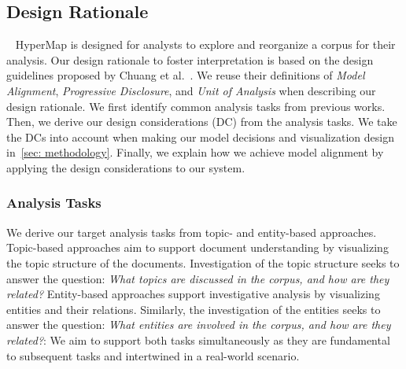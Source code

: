 \subsection{Design Rationale}~\label{sec: design_rationale}
HyperMap is designed for analysts to explore and reorganize a corpus for their analysis.
Our design rationale to foster interpretation is based on the design guidelines proposed by Chuang et al.~\cite{chuang2012interpretation}.
We reuse their definitions of \textit{Model Alignment}, \textit{Progressive Disclosure}, and \textit{Unit of Analysis} when describing our design rationale.
We first identify common analysis tasks from previous works.
Then, we derive our design considerations (DC) from the analysis tasks.
We take the DCs into account when making our model decisions and visualization design in~\autoref{sec: methodology}.
Finally, we explain how we achieve model alignment by applying the design considerations to our system.

\subsubsection{Analysis Tasks}
We derive our target analysis tasks from topic- and entity-based approaches.
Topic-based approaches aim to support document understanding by visualizing the topic structure of the documents.
Investigation of the topic structure seeks to answer the question: \textit{What topics are discussed in the corpus, and how are they related?}
Entity-based approaches support investigative analysis by visualizing entities and their relations.
Similarly, the investigation of the entities seeks to answer the question: \textit{What entities are involved in the corpus, and how are they related?}: 
We aim to support both tasks simultaneously as they are fundamental to subsequent tasks and intertwined in a real-world scenario.

